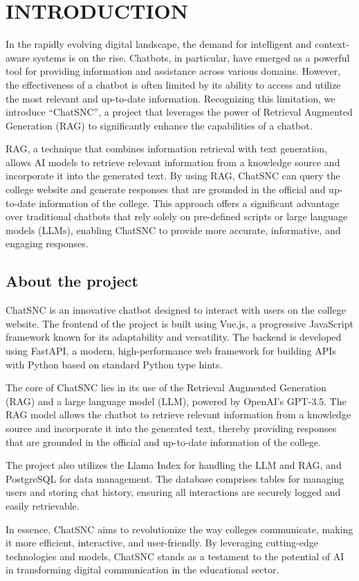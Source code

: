 
\chapter{INTRODUCTION}
In the rapidly evolving digital landscape, the demand for intelligent and context-aware systems is on the rise. Chatbots, in particular, have emerged as a powerful tool for providing information and assistance across various domains. However, the effectiveness of a chatbot is often limited by its ability to access and utilize the most relevant and up-to-date information. Recognizing this limitation, we introduce “ChatSNC”, a project that leverages the power of Retrieval Augmented Generation (RAG) to significantly enhance the capabilities of a chatbot.

RAG, a technique that combines information retrieval with text generation, allows AI models to retrieve relevant information from a knowledge source and incorporate it into the generated text. By using RAG, ChatSNC can query the college website and generate responses that are grounded in the official and up-to-date information of the college. This approach offers a significant advantage over traditional chatbots that rely solely on pre-defined scripts or large language models (LLMs), enabling ChatSNC to provide more accurate, informative, and engaging responses.

\section{About the project}  

ChatSNC is an innovative chatbot designed to interact with users on the college website. The frontend of the project is built using Vue.js, a progressive JavaScript framework known for its adaptability and versatility. The backend is developed using FastAPI, a modern, high-performance web framework for building APIs with Python based on standard Python type hints.

The core of ChatSNC lies in its use of the Retrieval Augmented Generation (RAG) and a large language model (LLM), powered by OpenAI's GPT-3.5. The RAG model allows the chatbot to retrieve relevant information from a knowledge source and incorporate it into the generated text, thereby providing responses that are grounded in the official and up-to-date information of the college.

The project also utilizes the Llama Index for handling the LLM and RAG, and PostgreSQL for data management. The database comprises tables for managing users and storing chat history, ensuring all interactions are securely logged and easily retrievable.

In essence, ChatSNC aims to revolutionize the way colleges communicate, making it more efficient, interactive, and user-friendly. By leveraging cutting-edge technologies and models, ChatSNC stands as a testament to the potential of AI in transforming digital communication in the educational sector.
